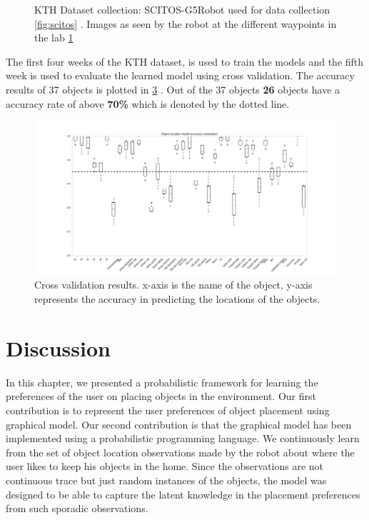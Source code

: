 \begin{figure}
\begin{subfigure}[b]{0.6\textwidth}
        \caption{}
        \label{fig:robot-view}
    \end{subfigure}
    \caption[KTH dataset collection]{KTH Dataset collection: SCITOS-G5\footnotemark Robot used for data collection \ref{fig:scitos} \protect. Images \footnotemark as seen by the robot at the different waypoints in the lab \ref{fig:robot-view}}\label{fig:kth-dataset}
\end{figure}





The first four weeks of the KTH dataset, is used to train the models and the fifth week is used to evaluate the learned model using cross validation. The accuracy results of 37 objects is plotted in \ref{fig:kth_object_evaluation} . 
Out of the 37 objects \textbf{26} objects have a accuracy rate of above \textbf{70\%} which is denoted by the dotted line. 

\begin{figure}[htp]
\centering
\includegraphics[width=\textwidth]{images/kth_dataset_accuracy.png}
\caption[Cross validation results]{Cross validation results. x-axis is the name of the object, y-axis represents the accuracy in predicting the locations of the objects. }
\label{fig:kth_object_evaluation}
\end{figure}


\section{Discussion}
In this chapter, we presented a probabilistic framework for learning the preferences of the user on placing objects in the environment. Our first contribution is to represent the user preferences of object placement using graphical model. Our second contribution is that the graphical model has been implemented using a probabilistic programming language. We continuously learn from the set of object location observations made by the robot about where the user likes to keep his objects in the home. Since the observations are not continuous trace but just random instances of the objects, the model was designed to be able to capture the latent knowledge in the placement preferences from such sporadic observations.

